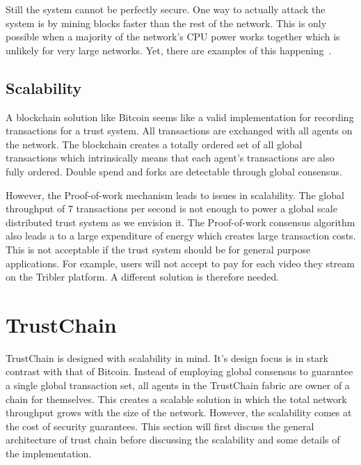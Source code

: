 Still the system cannot be perfectly secure. One way to actually attack the system is by mining 
blocks faster than the rest of the network. This is only possible when a majority of the network's 
CPU power works together which is unlikely for very large networks. Yet, there are examples of this 
happening~\cite{51percentbitcoingold, 51percentverge}.

\subsection{Scalability}
A blockchain solution like Bitcoin seems like a valid implementation for recording transactions for a
trust system. All transactions are exchanged with all agents on the network. The blockchain 
creates a totally ordered set of all global transactions which intrinsically means that each agent's 
transactions are also fully ordered. Double spend and forks are detectable through global consensus. 

However, the Proof-of-work mechanism leads to issues in scalability. The global throughput of 7 
transactions per second is not enough to power a global scale distributed trust system as we envision it. 
The Proof-of-work consensus algorithm also leads a to a large expenditure of energy which creates 
large transaction costs. This is not acceptable if the trust system should be for general purpose 
applications. For example, users will not accept to pay for each video they stream on the Tribler 
platform. A different solution is therefore needed.

\section{TrustChain}
\label{sec:trustchain}
TrustChain is designed with scalability in mind. It's design focus is in stark contrast with that of
Bitcoin. Instead of employing global consensus to guarantee a single global transaction set, 
all agents in the TrustChain fabric are owner of a chain for themselves. This creates a scalable 
solution in which the total network throughput grows with the size of the network. However, the
scalability comes at the cost of security guarantees. This section will first discuss the general 
architecture of trust chain before discussing the scalability and some details of the implementation.

